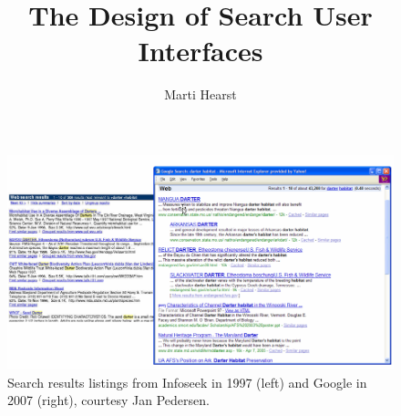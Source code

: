 \documentclass[sigconf,nonacm,screen,pbalance]{acmart}
\begin{document}
\title{The Design of Search User Interfaces}
\author{Marti Hearst}
\maketitle

\setcounter{tocdepth}{1}
\renewcommand*\contentsname{Chapter Content}
\tableofcontents
\vspace{-20pt}

\begin{figure}[ht]
    \includegraphics[width=\columnwidth]{./infoseek_vs_google.png}
    \vspace{-20pt}
    \caption{Search results listings from Infoseek in 1997 (left) and Google in 2007 (right), courtesy Jan Pedersen.}
    \label{fig:figure-1}
    \vspace{-10pt}
\end{figure}
\end{document}
